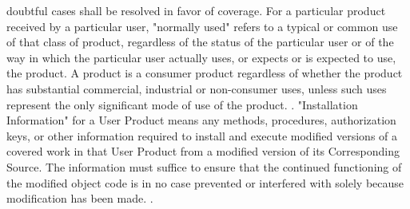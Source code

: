 \begin{script}
 doubtful cases shall be resolved in favor of coverage.  For a particular
 product received by a particular user, "normally used" refers to a
 typical or common use of that class of product, regardless of the status
 of the particular user or of the way in which the particular user
 actually uses, or expects or is expected to use, the product.  A product
 is a consumer product regardless of whether the product has substantial
 commercial, industrial or non-consumer uses, unless such uses represent
 the only significant mode of use of the product.
 .
   "Installation Information" for a User Product means any methods,
 procedures, authorization keys, or other information required to install
 and execute modified versions of a covered work in that User Product from
 a modified version of its Corresponding Source.  The information must
 suffice to ensure that the continued functioning of the modified object
 code is in no case prevented or interfered with solely because
 modification has been made.
 .
\end{script}
